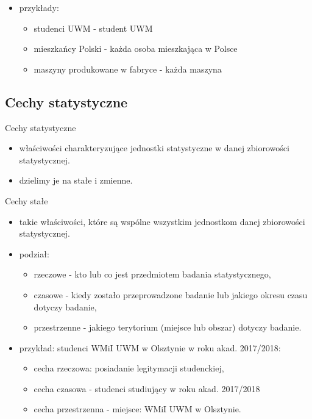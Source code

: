 \documentclass[
  polish,
  letterpaper,
  DIV=11,
  numbers=noendperiod]{scrreprt}
\providecommand{\tightlist}{%
  \setlength{\itemsep}{0pt}\setlength{\parskip}{0pt}}
\begin{document}
\begin{itemize}
\tightlist
\item
  przykłady:

  \begin{itemize}
  \tightlist
  \item
    studenci UWM - student UWM
  \item
    mieszkańcy Polski - każda osoba mieszkająca w Polsce
  \item
    maszyny produkowane w fabryce - każda maszyna
  \end{itemize}
\end{itemize}

\subsection{Cechy statystyczne}\label{cechy-statystyczne}

Cechy statystyczne

\begin{itemize}
\tightlist
\item
  właściwości charakteryzujące jednostki statystyczne w danej
  zbiorowości statystycznej.
\item
  dzielimy je na stałe i zmienne.
\end{itemize}

Cechy stałe

\begin{itemize}
\tightlist
\item
  takie właściwości, które są wspólne wszystkim jednostkom danej
  zbiorowości statystycznej.
\item
  podział:

  \begin{itemize}
  \tightlist
  \item
    rzeczowe - kto lub co jest przedmiotem badania statystycznego,
  \item
    czasowe - kiedy zostało przeprowadzone badanie lub jakiego okresu
    czasu dotyczy badanie,
  \item
    przestrzenne - jakiego terytorium (miejsce lub obszar) dotyczy
    badanie.
  \end{itemize}
\item
  przykład: studenci WMiI UWM w Olsztynie w roku akad. 2017/2018:

  \begin{itemize}
  \tightlist
  \item
    cecha rzeczowa: posiadanie legitymacji studenckiej,
  \item
    cecha czasowa - studenci studiujący w roku akad. 2017/2018
  \item
    cecha przestrzenna - miejsce: WMiI UWM w Olsztynie.
  \end{itemize}
\end{itemize}
\end{document}
